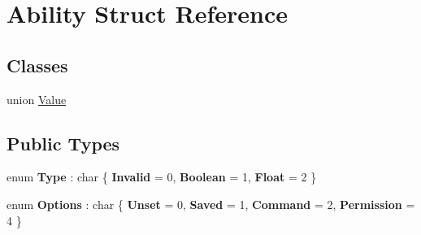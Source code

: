 \hypertarget{struct_ability}{}\section{Ability Struct Reference}
\label{struct_ability}
\subsection*{Classes}
\begin{DoxyCompactItemize}
\item 
union \mbox{\hyperlink{union_ability_1_1_value}{Value}}
\end{DoxyCompactItemize}
\subsection*{Public Types}
\begin{DoxyCompactItemize}
\item 
\mbox{\label{struct_ability_a372315d40a7484f881569d29b2bb5a55}} 
enum {\bfseries Type} \+: char \{ {\bfseries Invalid} = 0, 
{\bfseries Boolean} = 1, 
{\bfseries Float} = 2
 \}
\item 
\mbox{\label{struct_ability_a6bde89eeb81361696e97a0e817d1543d}} 
enum {\bfseries Options} \+: char \{ {\bfseries Unset} = 0, 
{\bfseries Saved} = 1, 
{\bfseries Command} = 2, 
{\bfseries Permission} = 4
 \}
\end{DoxyCompactItemize}
